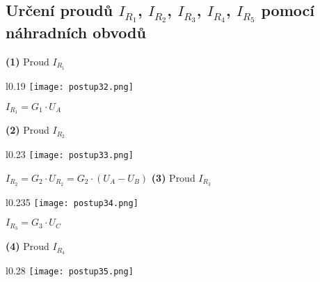 \documentclass[a4paper,12pt]{article}
\begin{document}
\subsection{Určení proudů $I_{R_1}$, $I_{R_2}$, $I_{R_3}$, $I_{R_4}$, $I_{R_5}$ pomocí náhradních obvodů}
\hspace{1em}\textbf{(1)} Proud $I_{R_1}$\par
\begin{wrapfigure}{l}{0.19\textwidth}
\vspace{-70pt}
\texttt{[image: postup32.png]}
\vspace{-95pt}
\end{wrapfigure}
\vspace{60pt}
\hspace{2.15em}$I_{R_1}=G_1\cdot U_A$\par\vspace{7.8em}
\hspace{1em}\textbf{(2)} Proud $I_{R_2}$\par
\begin{wrapfigure}{l}{0.23\textwidth}
\vspace{-65pt}
\texttt{[image: postup33.png]}
\vspace{-75pt}
\end{wrapfigure}
\vspace{50pt}
\hspace{1em}$I_{R_2}=G_2\cdot U_{R_2}=G_2\cdot (U_A-U_B)$\newpage
\hspace{1em}\textbf{(3)} Proud $I_{R_3}$\par
\begin{wrapfigure}{l}{0.235\textwidth}
\vspace{-45pt}
\texttt{[image: postup34.png]}
\vspace{-60pt}
\end{wrapfigure}
\vspace{30pt}
\hspace{1em}$I_{R_3}=G_3\cdot U_C$\par\vspace{4em}
\hspace{1em}\textbf{(4)} Proud $I_{R_4}$\par
\begin{wrapfigure}{l}{0.28\textwidth}
\vspace{-58pt}
\texttt{[image: postup35.png]}
\vspace{-75pt}
\end{wrapfigure}
\vspace{56pt}
\end{document}
